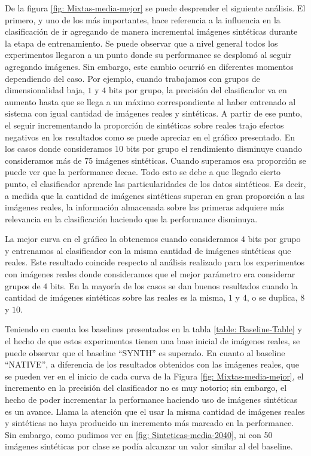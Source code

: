 	De la figura \ref{fig: Mixtas-media-mejor} se puede desprender el siguiente análisis. El primero, y uno de los más importantes, hace referencia a la influencia en la clasificación de ir agregando de manera incremental imágenes sintéticas durante la etapa de entrenamiento. Se puede observar que a nivel general todos los ex\-pe\-ri\-men\-tos llegaron a un punto donde su performance se desplomó al seguir agregando imágenes. Sin embargo, este cambio ocurrió en diferentes momentos dependiendo del caso. Por ejemplo, cuando trabajamos con grupos de dimensionalidad baja, $1$ y $4$ bits por grupo, la precisión del clasificador va en aumento hasta que se llega a un máximo correspondiente al haber entrenado al sistema con igual cantidad de imágenes reales y sintéticas. A partir de ese punto, el seguir incrementando la proporción de sintéticas sobre reales trajo efectos negativos en los resultados como se puede apreciar en el gráfico presentado. En los casos donde consideramos $10$ bits por grupo el rendimiento disminuye cuando consideramos más de 75 imágenes sintéticas. Cuando superamos esa proporción se puede ver que la performance decae. Todo esto se debe a que llegado cierto punto, el clasificador aprende las particularidades de los datos sintéticos. Es decir, a medida que la cantidad de imágenes sintéticas superan en gran proporción a las imágenes reales, la información almacenada sobre las primeras adquiere más relevancia en la clasificación haciendo que la performance disminuya.

	 La mejor curva en el gráfico la obtenemos cuando consideramos $4$ bits por grupo y entrenamos al clasificador con la misma cantidad de imágenes sintéticas que reales. Este resultado coincide respecto al análisis realizado para los experimentos con imágenes reales donde consideramos que el mejor parámetro era considerar grupos de $4$ bits. En la mayoría de los casos se dan buenos resultados cuando la cantidad de imágenes sintéticas sobre las reales es la misma, $1$ y $4$, o se duplica, $8$ y $10$.

	 Teniendo en cuenta los baselines presentados en la tabla \ref{table: Baseline-Table} y el hecho de que estos experimentos tienen una base inicial de imágenes reales, se puede observar que el baseline ``SYNTH'' es superado. En cuanto al baseline ``NATIVE'', a diferencia de los resultados obtenidos con las imágenes reales, que se pueden ver en el inicio de cada curva de la Figura \ref{fig: Mixtas-media-mejor}, el incremento en la precisión del clasificador no es muy notorio; sin embargo, el hecho de poder incrementar la performance haciendo uso de imágenes sintéticas es un avance. Llama la atención que el usar la misma cantidad de imágenes reales y sintéticas no haya producido un incremento más marcado en la performance. Sin embargo, como pudimos ver en \ref{fig: Sinteticas-media-2040}, ni con 50 imágenes sintéticas por clase se podía alcanzar un valor similar al del baseline.

